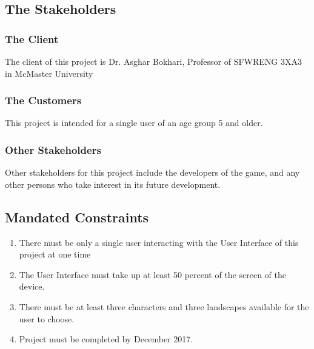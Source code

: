 \documentclass[12pt, titlepage]{article}
\begin{document}
\subsection{The Stakeholders}

\subsubsection{The Client}
The client of this project is Dr. Asghar Bokhari, Professor of SFWRENG 3XA3 in McMaster University

\subsubsection{The Customers}
This project is intended for a single user of an age group 5 and older. 

\subsubsection{Other Stakeholders}
Other stakeholders for this project include the developers of the game, and any other persons who take interest in its future development.

\subsection{Mandated Constraints}
\begin{enumerate}
\item There must be only a single user interacting with the User Interface of this project at one time
\item The User Interface must take up at least 50 percent of the screen of the device.
\item There must be at least three characters and three landscapes available for the user to choose.
\item Project must be completed by December 2017.
\end{enumerate}
\end{document}
